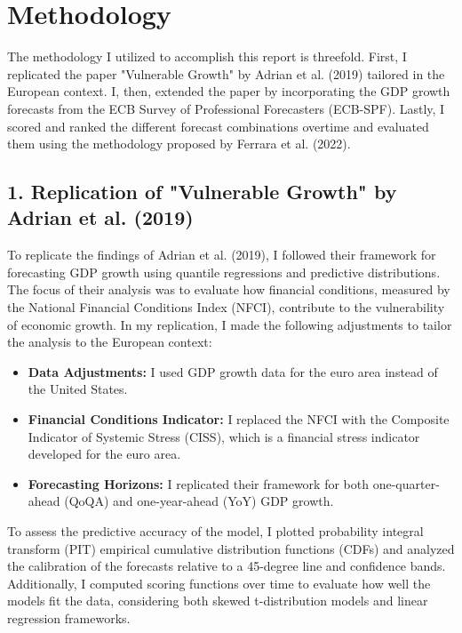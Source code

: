 \documentclass{article}
\begin{document}
\begin{landscape}
\begin{longtable}{|p{3cm}|p{5cm}|p{3cm}|p{3cm}|p{4cm}|p{4cm}|}
\end{longtable}
\end{landscape}



\section{Methodology}

The methodology I utilized to accomplish this report is threefold. First, I replicated the paper "Vulnerable Growth" by Adrian et al. (2019) tailored in the European context. I, then, extended the paper by incorporating the GDP growth forecasts from the ECB Survey of Professional Forecasters (ECB-SPF). Lastly, I scored and ranked the different forecast combinations overtime and evaluated them using the methodology proposed by Ferrara et al. (2022).

\subsection*{1. Replication of "Vulnerable Growth" by Adrian et al. (2019)}

To replicate the findings of Adrian et al. (2019), I followed their framework for forecasting GDP growth using quantile regressions and predictive distributions. The focus of their analysis was to evaluate how financial conditions, measured by the National Financial Conditions Index (NFCI), contribute to the vulnerability of economic growth. In my replication, I made the following adjustments to tailor the analysis to the European context:
\begin{itemize}
    \item \textbf{Data Adjustments:} I used GDP growth data for the euro area instead of the United States.
    \item \textbf{Financial Conditions Indicator:} I replaced the NFCI with the Composite Indicator of Systemic Stress (CISS), which is a financial stress indicator developed for the euro area.
    \item \textbf{Forecasting Horizons:} I replicated their framework for both one-quarter-ahead (QoQA) and one-year-ahead (YoY) GDP growth.
\end{itemize}

To assess the predictive accuracy of the model, I plotted probability integral transform (PIT) empirical cumulative distribution functions (CDFs) and analyzed the calibration of the forecasts relative to a 45-degree line and confidence bands. Additionally, I computed scoring functions over time to evaluate how well the models fit the data, considering both skewed t-distribution models and linear regression frameworks.
\end{document}
